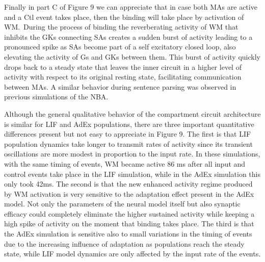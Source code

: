 \documentclass[10pt]{article}
\begin{document}
Finally in part C of Figure 9 we can appreciate that in case both MAs
are active and a Ctl event takes place, then the binding will take
place by activation of WM.~During the process of binding the
reverberating activity of WM that inhibits the GKs connecting SAs
creates a sudden burst of activity leading to a pronounced spike as
SAs become part of a self excitatory closed loop, also elevating the
activity of Gs and GKs between them. This burst of activity quickly
drops back to a steady state that leaves the inner circuit in a higher
level of activity with respect to its original resting state,
facilitating communication between MAs. A similar behavior during
sentence parsing was observed in previous simulations of the
NBA\cite{Frank_2014}.

Although the general qualitative behavior of the compartment circuit
architecture is similar for LIF and AdEx populations, there are three
important quantitative differences present but not easy to appreciate
in Figure 9. The first is that LIF population dynamics take longer to
transmit rates of activity since its transient oscillations are more
modest in proportion to the input rate. In these simulations, with the
same timing of events, WM became active 86 ms after all input and
control events take place in the LIF simulation, while in the AdEx
simulation this only took 42ms. The second is that the new enhanced
activity regime produced by WM activation is very sensitive to the
adaptation effect present in the AdEx model. Not only the parameters
of the neural model itself but also synaptic efficacy could completely
eliminate the higher sustained activity while keeping a high spike of
activity on the moment that binding takes place. The third is that the
AdEx simulation is sensitive also to small variations in the timing of
events due to the increasing influence of adaptation as populations
reach the steady state, while LIF model dynamics are only affected by
the input rate of the events.
\end{document}
